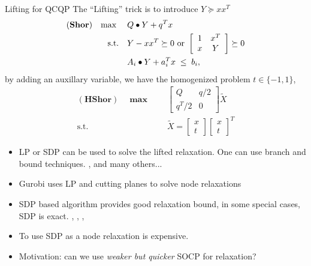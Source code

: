 \documentclass[aspectratio=1610, 10pt]{beamer}
\newcommand{\model}[1]{(\textbf{#1})}
\newcommand{\mx}{\mathbf{\max}\;}
\begin{document}
\begin{frame}[allowframebreaks]{Lifting for QCQP}
  The ``Lifting'' trick is to introduce \(Y \succeq xx^T\)
  \begin{equation}
    \label{eq:shor_basic}
    \begin{aligned}
      \model{Shor} \quad \mx \quad & Q \bullet Y + q^T x                                              \\
      \textrm{s.t.} \quad          & Y - xx^T \succeq 0 \text{ or } \left[
      \begin{array}{cc}
          1 & x^T \\
          x & Y
        \end{array} \right] \succeq 0                                                     \\
                                   & A_i \bullet Y + a_i^T x \hspace{0.27em} \le \hspace{0.27em} b_i,
    \end{aligned}
  \end{equation}
  by adding an auxillary variable, we have the homogenized problem
  $t \in \{- 1, 1\}$,
  \begin{equation}
    \label{eq:shor_homo}
    \begin{aligned}
      \model{HShor} \quad \mx \quad & \left[ \begin{array}{cc}
          Q       & q / 2 \\
          q^T / 2 & 0
        \end{array} \right] \tilde{X}                                              \\
      \textrm{s.t.} \quad           & \tilde{X} = \left[ \begin{array}{c}
          x \\
          t
        \end{array} \right] \left[ \begin{array}{c}
          x \\
          t
        \end{array} \right]^T
    \end{aligned}
  \end{equation}
  \framebreak
  \begin{itemize}
    \item LP or SDP can be used to solve the lifted relaxation. One can use branch and bound techniques. \cite{linderoth_simplicial_2005}, and many others...
    \item Gurobi uses LP and cutting planes to solve node relaxations
    \item SDP based algorithm provides good relaxation bound, in some special cases, SDP is exact. \cite{ye_new_2003}, \cite{sturm_cones_2003}, \cite{burer_exact_2019}, \cite{wang_new_2021}
    \item To use SDP as a node relaxation is expensive.
    \item Motivation: can we use \emph{weaker but quicker} SOCP for relaxation?
  \end{itemize}
\end{frame}
\end{document}
